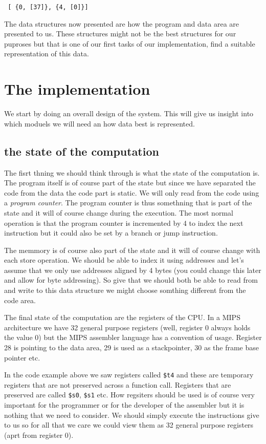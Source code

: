\documentclass[a4paper,11pt]{article}
\begin{document}
\begin{verbatim}
 [ {0, [37]}, {4, [0]}]
\end{verbatim}

The data structures now presented are how the program and data area
are presented to us. These structures might not be the best structures
for our puproses but that is one of our first tasks of our
implementation, find a suitable representation of this data.

\section{The implementation}

We start by doing an overall design of the system. This will give us
insight into which moduels we will need an how data best is
represented.

\subsection{the state of the computation}

The fisrt thning we should think through is what the state of the
computation is. The program itself is of course part of the state but
since we have separated the code from the data the code part is
static. We will only read from the code using a {\em program
  counter}. The program counter is thus somethning that is part of the
state and it will of course change during the execution. The most
normal operation is that the program counter is incremented by 4 to
index the next instruction but it could also be set by a branch or
jump instruction.

The memmory is of course also part of the state and it will of course
change with each store operation. We should be able to index it using
addresses and let's assume that we only use addresses aligned by 4
bytes (you could change this later and allow for byte addressing). So
give that we should both be able to read from and write to this data
structure we might choose somthing different from the code area.

The final state of the computation are the registers of the CPU. In a
MIPS architecture we have 32 general purpose registers (well, register
0 always holds the value 0) but the MIPS assembler language has a
convention of usage. Register 28 is pointing to the data area, 29 is
used as a stackpointer, 30 as the frame base pointer etc.

In the code example above we saw registers called {\tt \$t4} and these
are temporary registers that are not preserved across a function
call. Registers that are preserved are called {\tt \$s0}, {\tt \$s1}
etc. How regsiters should be used is of course very important for the
programmer or for the developer of the assembler but it is nothing
that we need to consider. We should simply execute the instructions
give to us so for all that we care we could view them as 32 general
purpose registers (aprt from register 0).
\end{document}
